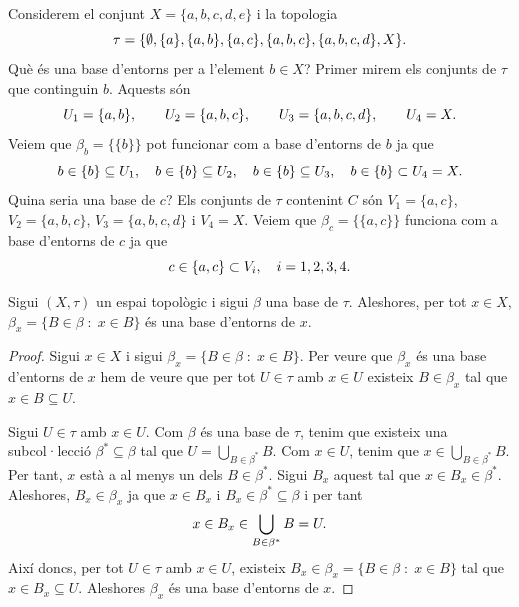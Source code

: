 \documentclass[../main.tex]{subfiles}
\begin{document}
\begin{ej}
\label{ej:baseentorn2} Considerem el conjunt $X =\{a,b,c,d,e\}$ i la topologia
\begin{equation}
    \notag
    \tau = \{\emptyset,\{a\},\{a,b\},\{a,c\},\{a,b,c\},\{a,b,c,d\},X\} .
\end{equation}
Què és una base d'entorns per a l'element $b\in X$? Primer mirem els conjunts de $\tau$ que continguin $b$. Aquests són
\begin{equation}
    \notag
    U_1 = \{a,b\},\qquad U_2 = \{a,b,c\},\qquad U_3 = \{a,b,c,d\},\qquad U_4 = X.
\end{equation}
Veiem que $\beta_b = \{\{b\}\}$ pot funcionar com a base d'entorns de $b$ ja que
\begin{equation}
    \notag
    b\in\{b\}\subseteq U_1,\quad b\in\{b\}\subseteq U_2,\quad b\in\{b\} \subseteq U_3,\quad b\in\{b\} \subset U_4= X.
\end{equation}
Quina seria una base de $c$? Els conjunts de $\tau$ contenint $C$ són $V_1 = \{a,c\}$, $V_2  = \{a,b,c\}$, $V_3 = \{a,b,c,d\}$ i $V_4 = X$. Veiem que $\beta_c = \{\{a,c\}\}$ funciona com a base d'entorns de $c$ ja que
\begin{equation}
    \notag
    c\in\{a,c\}\subset V_i,\quad i=1,2,3,4.
\end{equation}
\end{ej}

\begin{prop}
\label{prop:baseentorn1} Sigui $(X,\tau)$ un espai topològic i sigui $\beta$ una base de $\tau$. Aleshores, per tot $x\in X$, $\beta_x = \{B\in\beta\;:\;x\in B\}$ és una base d'entorns de $x$.
\end{prop}
\begin{proof}
Sigui $x\in X$ i sigui $\beta_x = \{B\in\beta\;:\;x\in B\}$. Per veure que $\beta_x$ és una base d'entorns de $x$ hem de veure que per tot $U\in\tau$ amb $x\in U$ existeix $B\in\beta_x$ tal que $x\in B\subseteq U$.

Sigui $U\in\tau$ amb $x\in U$. Com $\beta$ és una base de $\tau$, tenim que existeix una subcol·lecció $\beta^*\subseteq \beta$ tal que $U = \bigcup_{B\in\beta^*}B$. Com $x\in U$, tenim que $x\in\bigcup_{B\in\beta^*}B$. Per tant, $x$ està a al menys un dels $B\in\beta^*$. Sigui $B_x$ aquest tal que $x\in B_x\in\beta^*$. Aleshores, $B_x\in\beta_x$ ja que $x\in B_x$ i $B_x\in\beta^*\subseteq\beta$ i per tant
\begin{equation}
    \notag
    x\in B_x\in\bigcup_{B\in\beta^*}B = U.
\end{equation}
Així doncs, per tot $U\in\tau$ amb $x\in U$, existeix $B_x\in\beta_x = \{B\in\beta\;:\;x\in B\}$ tal que $x\in B_x\subseteq U$. Aleshores $\beta_x$ és una base d'entorns de $x$.
\end{proof}
\end{document}
